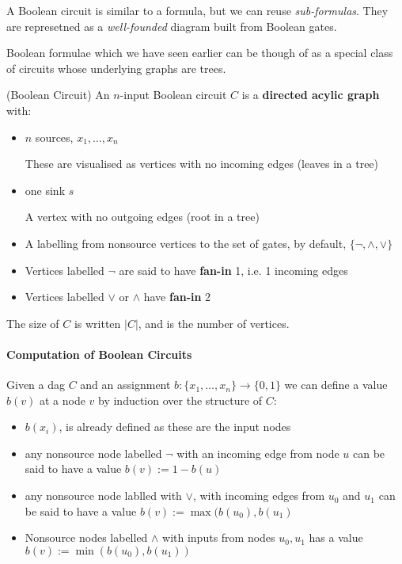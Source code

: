\documentclass{report}
\begin{document}
A Boolean circuit is similar to a formula, but we can reuse \textit{sub-formulas}. They are represetned as a \textit{well-founded} diagram built from Boolean gates.

Boolean formulae which we have seen earlier can be though of as a special class of circuits whose underlying graphs are trees.


\begin{definition}(Boolean Circuit)
  An $n$-input Boolean circuit $C$ is a \textbf{directed acylic graph} with:

  \begin{itemize}
    \item $n$ sources, $x_{1},\ldots,x_{n}$

          These are visualised as vertices with no incoming edges (leaves in a tree)

    \item one sink $s$

          A vertex with no outgoing edges (root in a tree)


    \item A labelling from nonsource vertices to the set of gates, by default, $\{ \neg,\wedge, \vee \} $
    \item Vertices labelled $\neg$ are said to have \textbf{fan-in} 1, i.e. 1 incoming edges
    \item Vertices labelled $\vee$ or \(\wedge\) have \textbf{fan-in} 2
  \end{itemize}

  The size of $C$ is written $|C|$, and is the number of vertices.
\end{definition}

\paragraph{Computation of Boolean Circuits}

Given a dag $C$ and an assignment $b: \{ x_{1},\ldots,x_{n} \} \rightarrow \{ 0,1 \}  $ we can define a value $b(v)$ at a node $v$ by induction over the structure of $C$:

\begin{itemize}
  \item $b(x_{i})$, is already defined as these are the input nodes
  \item any nonsource node labelled $\neg$ with an incoming edge from node $u$ can be said to have a value $b(v) := 1-b(u)$
  \item any nonsource node lablled with $\vee$, with incoming edges from $u_{0}$ and $u_{1}$ can be said to have a value $b(v) := \max(b(u_{0}),b(u_{1})$
  \item Nonsource nodes labelled $\wedge$ with inputs from nodes $u_{0},u_{1}$ has a value $b(v) := \min(b(u_{0}),b(u_{1}))$
\end{itemize}
\end{document}
